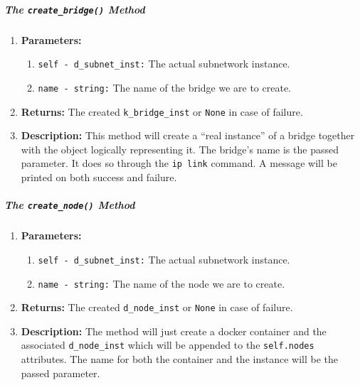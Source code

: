         \subparagraph{The \texttt{create\_bridge()} Method}
            \begin{enumerate}
                \item \textbf{Parameters:}
                \begin{enumerate}
                    \item \texttt{self - d\_subnet\_inst:} The actual subnetwork instance.
                    \item \texttt{name - string:} The name of the bridge we are to create.
                \end{enumerate}
                \item \textbf{Returns:} The created \texttt{k\_bridge\_inst} or \texttt{None} in case of failure.
                \item \textbf{Description:} This method will create a ``real instance'' of a bridge together with the object logically representing it. The bridge's name is the passed parameter. It does so through the \texttt{ip link} command. A message will be printed on both success and failure.
            \end{enumerate}

        \subparagraph{The \texttt{create\_node()} Method}
            \begin{enumerate}
                \item \textbf{Parameters:}
                \begin{enumerate}
                    \item \texttt{self - d\_subnet\_inst:} The actual subnetwork instance.
                    \item \texttt{name - string:} The name of the node we are to create.
                \end{enumerate}
                \item \textbf{Returns:} The created \texttt{d\_node\_inst} or \texttt{None} in case of failure.
                \item \textbf{Description:} The method will just create a docker container and the associated \texttt{d\_node\_inst} which will be appended to the \texttt{self.nodes} attributes. The name for both the container and the instance will be the passed parameter.
            \end{enumerate}

